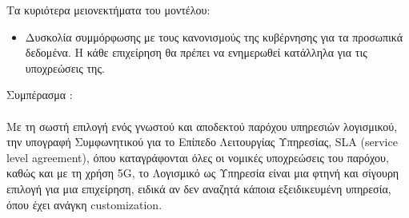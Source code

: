 \documentclass{article}
\begin{document}
Τα κυριότερα μειονεκτήματα του μοντέλου:
\begin{itemize}
  η χρήση Διαδικτύου, διαφορετικά δεν μπορεί να υπάρξει πρόσβαση στην εφαρμογή
 ασφάλεια ευαίσθητων δεδομένων, αν δεν είναι έμπιστος ο πάροχος
 ελέγχου, καθώς η υπηρεσία είναι έτοιμη για χρήση και δεν είναι εύκολο να μεταβληθεί και να προσαρμοστεί στις ανάγκες του κάθε χρήστη
 ταχύτητα μετάδοσης της εφαρμογής, καθώς ο σέρβερ μπορεί να βρίσκεται σε μεγάλη απόσταση από το Browser, όπου τη χρησιμοποιεί ο χρήστης. Για αυτό είναι αναγκαία η επένδυση σε γρήγορη ταχύτητα Διαδικτύου
\item Δυσκολία συμμόρφωσης με τους κανονισμούς της κυβέρνησης για τα προσωπικά δεδομένα. Η κάθε επιχείρηση θα πρέπει να ενημερωθεί κατάλληλα για τις υποχρεώσεις της.
\end{itemize}
Συμπέρασμα : \\ \\
Με τη σωστή επιλογή ενός γνωστού και αποδεκτού παρόχου υπηρεσιών λογισμικού, την υπογραφή Συμφωνητικού για το Επίπεδο Λειτουργίας Υπηρεσίας, SLA (service level agreement), όπου καταγράφονται όλες οι νομικές υποχρεώσεις του παρόχου, καθώς και με τη χρήση  5G, το Λογισμικό ως Υπηρεσία είναι μια φτηνή και σίγουρη επιλογή για μια επιχείρηση, ειδικά αν δεν αναζητά κάποια εξειδικευμένη υπηρεσία, όπου έχει ανάγκη  customization.
\end{document}
